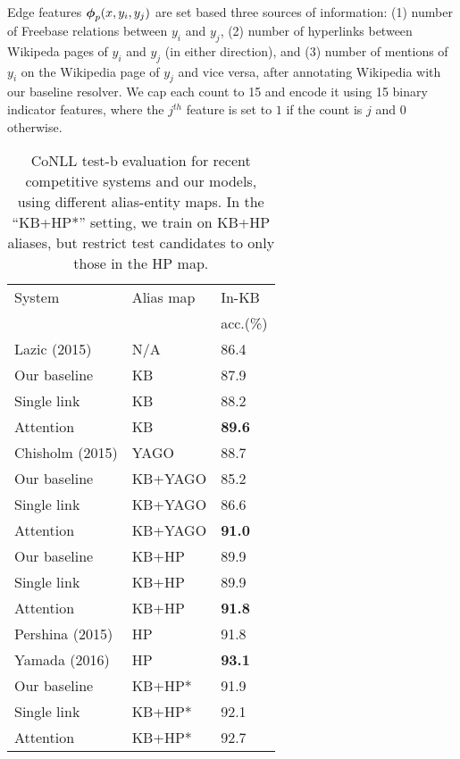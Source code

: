 {Edge features} $\boldsymbol{\phi}_p(x,y_i,y_j)$ are set based three sources of information: (1) number of Freebase relations between $y_i$ and $y_j$, (2) number of hyperlinks between Wikipeda pages of $y_i$ and $y_j$ (in either direction), and
(3) number of mentions of $y_i$ on the Wikipedia page of $y_j$ and vice versa, after
annotating  Wikipedia with our baseline resolver. 
We cap each count to 15 and encode it using 15 binary indicator features,
where the $j^{th}$ feature is set to $1$ if the count is $j$ and $0$ otherwise.


\begin{table}[t!]
  \centering
  \begin{tabular}{l|l|l}
    System                 &  Alias map  & In-KB  \\
    & & acc.(\%) \\
    \hline
    Lazic (2015)    & N/A          & 86.4 \\
    \hline
    Our baseline    & KB           & 87.9  \\
    Single link     & KB           & 88.2 \\
    Attention       & KB           & \textbf{89.6} \\
    \hline
        Chisholm (2015) & YAGO         & 88.7 \\ 
    Our baseline    & KB+YAGO      & 85.2 \\
    Single link     & KB+YAGO      & 86.6 \\
    Attention       & KB+YAGO      & {\bf 91.0} \\
    \hline
    Our baseline    & KB+HP        & 89.9 \\
    Single link & KB+HP & 89.9 \\
    Attention       & KB+HP        & {\bf 91.8} \\
    \hline
        Pershina (2015) & HP           & 91.8 \\
        Yamada (2016) & HP & {\bf 93.1} \\
    Our baseline &KB+HP* & 91.9 \\
    Single link     & KB+HP*       & 92.1 \\
    Attention       & KB+HP*       & {92.7} \\ \hline
  \end{tabular}
\caption{CoNLL test-b evaluation for recent competitive systems and
  our models, using different alias-entity maps.  In the ``KB+HP*''
  setting, we train on KB+HP aliases, but restrict test candidates to
  only those in the HP map.}
 \label{table:conll_results} 
\end{table}

